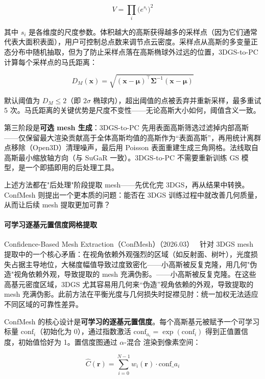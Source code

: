 \begin{equation}
V = \prod_{i} \bigl(e^{s_i}\bigr)^2
\end{equation}

其中 $s_i$ 是各维度的尺度参数。体积越大的高斯获得越多的采样点（因为它们通常代表大面积表面），用户可控制总点数来调节点云密度。采样点从高斯的多变量正态分布中随机抽取，但为了防止采样点落在高斯椭球外过远的位置，3DGS-to-PC 计算每个采样点的马氏距离：

\begin{equation}
D_M(\mathbf{x}) = \sqrt{(\mathbf{x} - \boldsymbol{\mu})^\top \boldsymbol{\Sigma}^{-1} (\mathbf{x} - \boldsymbol{\mu})}
\end{equation}

默认阈值为 $D_M \leq 2$（即 $2\sigma$ 椭球内），超出阈值的点被丢弃并重新采样，最多重试 5 次。马氏距离的关键优势是尺度不变性——无论高斯大小如何，阈值含义一致。

第三阶段是\textbf{可选 mesh 生成}：3DGS-to-PC 先用表面高斯筛选过滤掉内部高斯——仅保留最大渲染贡献高于全体高斯均值的高斯作为“表面高斯”，再用统计离群点移除（Open3D）清理噪声，最后用 Poisson 表面重建生成三角网格。法线取自高斯最小缩放轴方向（与 SuGaR 一致）。3DGS-to-PC 不需要重新训练 GS 模型，是一个即插即用的后处理工具。

上述方法都在"后处理"阶段提取 mesh——先优化完 3DGS，再从结果中转换。ConfMesh 则提出一个更本质的问题：能否在 3DGS 训练过程中就改善几何质量，从而让后续 mesh 提取更加可靠？

\paragraph{可学习逐基元置信度网格提取}

Confidence-Based Mesh Extraction（ConfMesh）（2026.03）~\cite{2603_24725} 针对 3DGS mesh 提取中的一个核心矛盾：在视角依赖外观强烈的区域（如反射面、树叶），光度损失占据主导地位，大梯度幅值导致过度致密化——小高斯被反复克隆，用几何"伪造"视角依赖外观，导致提取的 mesh 充满伪影。——小高斯被反复克隆。在这些高基元密度区域，3DGS 尤其容易用几何来“伪造”视角依赖的外观，导致提取的 mesh 充满伪影。此前方法在平衡光度与几何损失时捉襟见肘：统一加权无法适应不同区域的可靠性差异。

ConfMesh 的核心设计是\textbf{可学习的逐基元置信度}。每个高斯基元被赋予一个可学习标量 $\text{conf}_i$（初始化为 0），通过指数激活 $\text{conf}_{a_i} = \exp(\text{conf}_i)$ 得到正值置信度，初始值恰好为 1。置信度图通过 $\alpha$-混合 渲染到像素空间：

\begin{equation}
\hat{C}(\bm{r}) = \sum_{i=0}^{N-1} w_i(\bm{r}) \cdot \text{conf}\_a_i
\end{equation}

